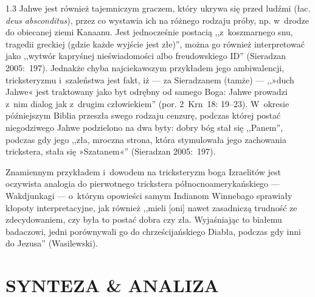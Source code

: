 \documentclass[11pt,a4paper,twoside]{report}
\begin{document}
\begin{spacing}{1.3}
Jahwe jest również tajemniczym graczem, który ukrywa się przed ludźmi (łac. \emph{deus absconditus}), przez co wystawia ich na różnego rodzaju próby, np. w~drodze do obiecanej ziemi Kanaanu. Jest jednocześnie postacią ,,z~koszmarnego snu, tragedii greckiej (gdzie każde wyjście jest złe)'', można go również interpretować jako ,,wytwór kapryśnej nieświadomości albo freudowskiego {\sc ID}'' (Sieradzan 2005:~197). Jednakże chyba najciekawszym przykładem jego ambiwalencji, tricksteryzmu i~szaleństwa jest fakt, iż --- za Sieradzanem (tamże) --- ,,»duch Jahwe« jest traktowany jako byt odrębny od samego Boga: Jahwe prowadzi z~nim dialog jak z~drugim człowiekiem'' (por. 2~Krn~18: 19--23). W~okresie późniejszym Biblia przeszła swego rodzaju cenzurę, podczas której postać niegodziwego Jahwe podzielono na dwa byty: dobry bóg stał się ,,Panem'', podczas gdy jego ,,zła, mroczna strona, która stymulowała jego zachowania trickstera, stała się »Szatanem«'' (Sieradzan 2005:~197).

Znamiennym przykładem i~dowodem na tricksteryzm boga Izraelitów jest oczywista analogia do pierwotnego trickstera północnoamerykańskiego --- Wakdjunkagi --- o~którym opowieści samym Indianom Winnebago sprawiały kłopoty interpretacyjne, jak również ,,mieli [oni] nawet zasadniczą trudność ze zdecydowaniem, czy była to postać dobra czy zła. Wyjaśniając to białemu badaczowi, jedni porównywali go do chrześcijańskiego Diabła, podczas gdy inni do Jezusa'' (Wasilewski).

\end{spacing}


\clearpage{\pagestyle{empty}\cleardoublepage}
\part{SYNTEZA \& ANALIZA}
\clearpage{\pagestyle{empty}\cleardoublepage}
\end{document}
